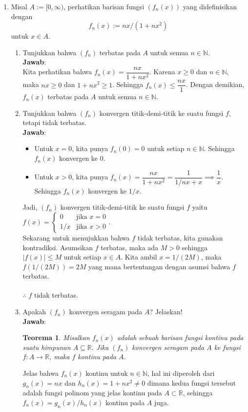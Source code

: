\documentclass[12pt,openany,a4paper]{article}
\newtheorem*{teorema}{Teorema}
\newcommand{\R}{\mathbb{R}}
\newcommand{\N}{\mathbb{N}}
\newcommand{\jawab}{\textbf{Jawab}:}
\begin{document}
\begin{enumerate}
    \item Misal $A:=[0,\infty)$, perhatikan barisan fungsi $(f_n(x))$ yang didefinisikan dengan
    \[f_n(x):=nx/(1+nx^2)\]
    untuk $x\in A$.
    \begin{enumerate}
        \item Tunjukkan bahwa $(f_n)$ terbatas pada $A$ untuk semua $n\in\N$.\\
            \jawab\\
            Kita perhatikan bahwa $f_n(x)=\dfrac{nx}{1+nx^2}$. Karena $x\geq 0$ dan $n\in\N$, 
            maka $nx\geq 0$ dan $1+nx^2\geq 1$. Sehingga $f_n(x)\leq \dfrac{nx}{1}$. Dengan 
            demikian, $f_n(x)$ terbatas pada $A$ untuk semua $n\in\N$.
            
            \item Tunjukkan bahwa $(f_n)$ konvergen titik-demi-titik ke suatu fungsi $f$, tetapi tidak terbatas.\\
            \jawab
            \begin{itemize}
                \item Untuk $x=0$, kita punya $f_n(0)=0$ untuk setiap $n\in\N$. Sehingga $f_n(x)$ konvergen ke $0$.
                \item Untuk $x>0$, kita punya $f_n(x)=\dfrac{nx}{1+nx^2}=\dfrac{1}{1/nx+x}\implies\dfrac{1}{x}$. 
                Sehingga $f_n(x)$ konvergen ke $1/x$.
            \end{itemize}
            Jadi, $(f_n)$ konvergen titik-demi-titik ke suatu fungsi $f$ yaitu $f(x)=\begin{cases}0&\text{jika }x=0\\1/x&\text{jika }x>0\end{cases}$.\\
            Sekarang untuk menujukkan bahwa $f$ tidak terbatas, kita gunakan kontradiksi. 
            Asumsikan $f$ terbatas, maka ada $M>0$ sehingga $|f(x)|\leq M$ untuk setiap $x\in A$. 
            Kita ambil $x=1/(2M)$, maka $f(1/(2M))=2M$ yang mana bertentangan dengan asumsi bahwa $f$ terbatas.\\\\
            $\therefore$ $f$ tidak terbatas.\\

            \item Apakah $(f_n)$ konvergen seragam pada $A$? Jelaskan!\\
            \jawab
            \begin{teorema}
                Misalkan $f_n(x)$ adalah sebuah barisan fungsi kontinu pada suatu himpunan 
                $A \subseteq \R$. Jika $(f_n)$ konvergen seragam pada $A$ ke fungsi $f : A \to \R$, 
                maka $f$ kontinu pada $A$.
            \end{teorema}
            Jelas bahwa $f_n(x)$ kontinu untuk $n\in\N$, hal ini diperoleh dari $g_n(x)=nx$ dan 
            $h_n(x)=1+nx^2\ne 0$ dimana kedua fungsi tersebut adalah fungsi polinom yang jelas kontinu pada $A\subset \R$, sehingga 
            $f_n(x)=g_n(x)/h_n(x)$ kontinu pada $A$ juga.
            

\end{enumerate}
\end{enumerate}
\end{document}
